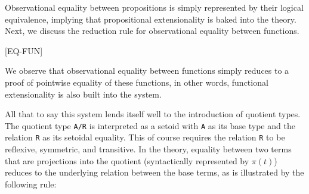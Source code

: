 \documentclass[12pt,twoside,maitrise]{dms}
\theoremstyle{definition}
\numberwithin{equation}{section}
\numberwithin{table}{chapter}
\numberwithin{figure}{chapter}
\newcommand\kw[1] {\textsf{#1}}
\newcommand\id[1] {\texttt{#1}}
\newcommand\fn[1] {\texttt{#1}}
\begin{document}
Observational equality between propositions is simply represented by their
logical equivalence, implying that propositional extensionality is baked into
the theory. Next, we discuss the reduction rule for observational equality
between functions.

\begin{prooftree*}

  [\kw{EQ-FUN}]{}
\end{prooftree*}

We observe that observational equality between functions simply reduces to a
proof of pointwise equality of these functions, in other words, functional
extensionality is also built into the system.

All that to say this system lends itself well to the introduction of quotient
types. The quotient type \fn{A/R} is interpreted as a setoid with \id{A} as its
base type and the relation \id{R} as its setoidal equality. This of course
requires the relation \id{R} to be reflexive, symmetric, and transitive. In the
theory, equality between two terms that are projections into the quotient
(syntactically represented by $\pi(t)$) reduces to the underlying relation
between the base terms, as is illustrated by the following rule:



\begin{prooftree*}

\end{prooftree*}
\end{document}
